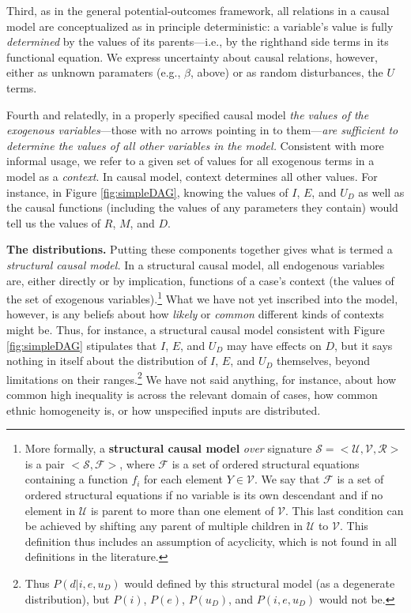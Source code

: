 \documentclass[12pt,]{book}
\let\rmarkdownfootnote\footnote%
\def\footnote{\protect\rmarkdownfootnote}
\begin{document}
Third, as in the general potential-outcomes framework, all relations in a causal model are conceptualized as in principle deterministic: a variable's value is fully \emph{determined} by the values of its parents---i.e., by the righthand side terms in its functional equation. We express uncertainty about causal relations, however, either as unknown paramaters (e.g., \(\beta\), above) or as random disturbances, the \(U\) terms.

Fourth and relatedly, in a properly specified causal model \emph{the values of the exogenous variables}---those with no arrows pointing in to them---\emph{are sufficient to determine the values of all other variables in the model.} Consistent with more informal usage, we refer to a given set of values for all exogenous terms in a model as a \emph{context}. In causal model, context determines all other values. For instance, in Figure \ref{fig:simpleDAG}, knowing the values of \(I\), \(E\), and \(U_D\) as well as the causal functions (including the values of any parameters they contain) would tell us the values of \(R\), \(M\), and \(D\).

\textbf{The distributions.} Putting these components together gives what is termed a \emph{structural causal model.} In a structural causal model, all endogenous variables are, either directly or by implication, functions of a case's context (the values of the set of exogenous variables).\footnote{More formally, a \textbf{structural causal model} \emph{over} signature \(\mathcal{S}=<\mathcal{U},\mathcal{V},\mathcal{R}>\) is a pair \(<\mathcal{S}, \mathcal{F}>\), where \(\mathcal{F}\) is a set of ordered structural equations containing a function \(f_i\) for each element \(Y\in \mathcal{V}\). We say that \(\mathcal{F}\) is a set of ordered structural equations if no variable is its own descendant and if no element in \(\mathcal{U}\) is parent to more than one element of \(\mathcal{V}\). This last condition can be achieved by shifting any parent of multiple children in \(\mathcal{U}\) to \(\mathcal{V}\). This definition thus includes an assumption of acyclicity, which is not found in all definitions in the literature.} What we have not yet inscribed into the model, however, is any beliefs about how \emph{likely} or \emph{common} different kinds of contexts might be. Thus, for instance, a structural causal model consistent with Figure \ref{fig:simpleDAG} stipulates that \(I\), \(E\), and \(U_D\) may have effects on \(D\), but it says nothing in itself about the distribution of \(I\), \(E\), and \(U_D\) themselves, beyond limitations on their ranges.\footnote{Thus \(P(d|i,e, u_D)\) would defined by this structural model (as a degenerate distribution), but \(P(i)\), \(P(e)\), \(P(u_D)\), and \(P(i,e, u_D)\) would not be.} We have not said anything, for instance, about how common high inequality is across the relevant domain of cases, how common ethnic homogeneity is, or how unspecified inputs are distributed.
\end{document}
